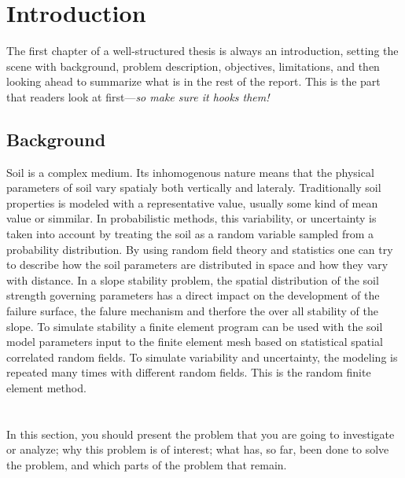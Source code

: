 \chapter{Introduction}
The first chapter of a well-structured thesis is always an introduction, setting the scene with background, problem description, objectives, limitations, and then looking ahead to summarize what is in the rest of the report. This is the part that readers look at first---\emph{so make sure it hooks them!}

\section{Background}
Soil is a complex medium.
Its inhomogenous nature means that the physical parameters of soil vary spatialy both vertically and lateraly.
Traditionally soil properties is modeled with a representative value, usually some kind of mean value or simmilar.
In probabilistic methods, this variability, or uncertainty is taken into account by treating the soil as a random variable sampled from a probability distribution.
By using random field theory and statistics one can try to describe how the soil parameters are distributed in space and how they vary with distance.
In a slope stability problem, the spatial distribution of the soil strength governing parameters has a direct impact on the development of the failure surface, the falure mechanism and therfore the over all stability of the slope.
To simulate stability a finite element program can be used with the soil model parameters input to the finite element mesh based on statistical spatial correlated random fields.
To simulate variability and uncertainty, the modeling is repeated many times with different random fields.
This is the random finite element method.\\
\\
\\
In this section, you should present the problem that you are going to investigate or analyze; why this problem is of interest; what has, so far, been done to solve the problem, and which parts of the problem that remain.
